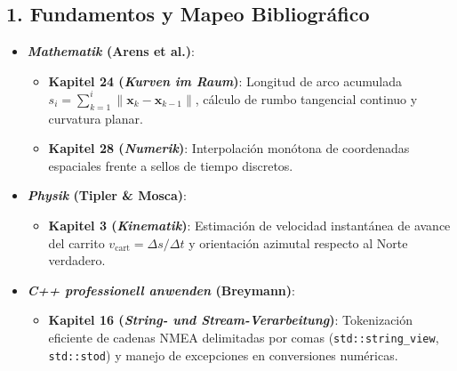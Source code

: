 \documentclass[11pt,a4paper]{article}
\begin{document}
\subsection{1. Fundamentos y Mapeo Bibliográfico}
\begin{itemize}
    \item \textbf{\textit{Mathematik} (Arens et al.)}:
    \begin{itemize}
        \item \textbf{Kapitel 24 (\textit{Kurven im Raum})}: Longitud de arco acumulada $s_i = \sum_{k=1}^i \|\mathbf{x}_k - \mathbf{x}_{k-1}\|$, cálculo de rumbo tangencial continuo y curvatura planar.
        \item \textbf{Kapitel 28 (\textit{Numerik})}: Interpolación monótona de coordenadas espaciales frente a sellos de tiempo discretos.
    \end{itemize}
    \item \textbf{\textit{Physik} (Tipler \& Mosca)}:
    \begin{itemize}
        \item \textbf{Kapitel 3 (\textit{Kinematik})}: Estimación de velocidad instantánea de avance del carrito $v_{\text{cart}} = \Delta s / \Delta t$ y orientación azimutal respecto al Norte verdadero.
    \end{itemize}
    \item \textbf{\textit{C++ professionell anwenden} (Breymann)}:
    \begin{itemize}
        \item \textbf{Kapitel 16 (\textit{String- und Stream-Verarbeitung})}: Tokenización eficiente de cadenas NMEA delimitadas por comas (\texttt{std::string\_view}, \texttt{std::stod}) y manejo de excepciones en conversiones numéricas.
    \end{itemize}
\end{itemize}
\end{document}
